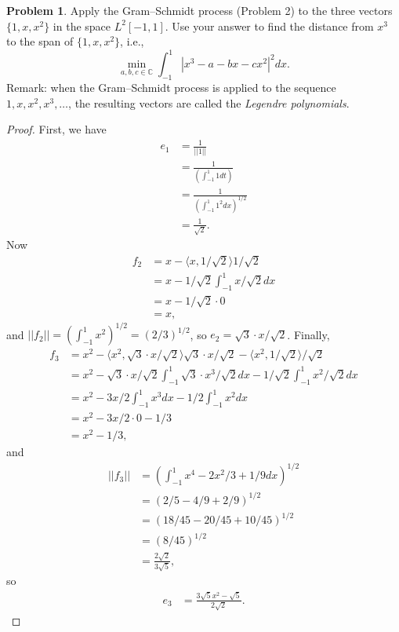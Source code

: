 \documentclass[12pt]{article}
\theoremstyle{definition}
\newtheorem{ex}{Problem}
\begin{document}
\begin{ex}
	Apply the Gram--Schmidt process (Problem 2) to the three vectors $\lbrace 1, x, x^2 \rbrace$ in the space $L^2[-1, 1]$.
	Use your answer to find the distance from $x^3$ to the span of $\lbrace 1, x, x^2 \rbrace$, i.e., \begin{equation*}
		\min_{a, b, c \in \mathbb{C}} \int_{-1}^1 \left| x^3 - a - bx - cx^2 \right|^2 dx.
	\end{equation*}
	Remark: when the Gram--Schmidt process is applied to the sequence $1, x, x^2, x^3, \dots$, the resulting vectors are called the \textit{Legendre polynomials}.
\end{ex}
\begin{proof}
	First, we have \begin{align*}
		e_1 & = \frac{1}{||1||}                                  \\
		    & = \frac{1}{\left( \int_{-1}^1 1dt \right)}         \\
		    & = \frac{1}{\left( \int_{-1}^1 1^2dx \right)^{1/2}} \\
		    & = \frac{1}{\sqrt{2}}.
	\end{align*}
	Now \begin{align*}
		f_2 & = x - \langle x, 1/\sqrt{2}\rangle 1/\sqrt{2} \\
		    & = x - 1/\sqrt{2} \int_{-1}^1 x/\sqrt{2} dx    \\
		    & = x - 1/\sqrt{2} \cdot 0                      \\
		    & = x,
	\end{align*}
	and $||f_2|| = \left(\int_{-1}^1 x^2\right)^{1/2} = (2/3)^{1/2}$, so $e_2 = \sqrt{3}\cdot x/\sqrt{2}$.
	Finally, \begin{align*}
		f_3 & = x^2 - \langle x^2, \sqrt3 \cdot x/\sqrt2 \rangle \sqrt3\cdot x/\sqrt2 - \langle x^2, 1/\sqrt2 \rangle /\sqrt2 \\
		    & = x^2 - \sqrt3\cdot x/\sqrt2\int_{-1}^1 \sqrt3 \cdot x^3/\sqrt2 dx  -  1/\sqrt2 \int_{-1}^1 x^2/\sqrt2 dx       \\
		    & = x^2 - 3 x/2\int_{-1}^1 x^3 dx  -  1/2 \int_{-1}^1 x^2 dx                                                      \\
		    & = x^2 - 3 x/2 \cdot 0  -  1/3                                                                                   \\
		    & = x^2 - 1/3,
	\end{align*}
	and \begin{align*}
		||f_3|| & = \left(\int_{-1}^1 x^4 - 2x^2/3 + 1/9 dx\right)^{1/2} \\
		        & = \left(2/5 - 4/9 + 2/9\right)^{1/2}                   \\
		        & = \left(18/45 - 20/45 + 10/45\right)^{1/2}             \\
		        & = \left(8/45\right)^{1/2}                              \\
		        & = \frac{2\sqrt2}{3\sqrt5},
	\end{align*}
	so \begin{align*}
		e_3 & = \frac{3\sqrt5 x^2 - \sqrt5}{2\sqrt2}.
	\end{align*}
\end{proof}
\end{document}

